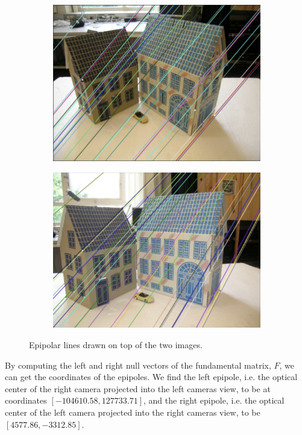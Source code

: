 \begin{figure}[h]
	\centering
	\begin{subfigure}{0.48\linewidth}
		\centering
		\includegraphics[width=\linewidth]{Materials/BaselineEpiA}
	\end{subfigure}
	\hfill
	\begin{subfigure}{0.48\linewidth}
		\centering
		\includegraphics[width=\linewidth]{Materials/BaselineEpiB}
	\end{subfigure}
	\caption{Epipolar lines drawn on top of the two images.}
	\label{baselineepipolarlines}
\end{figure}
By computing the left and right null vectors of the fundamental matrix, $F$, we can get the coordinates of the epipoles. We find the left epipole, i.e. the optical center of the right camera projected into the left cameras view, to be at coordinates $[-104610.58, 127733.71]$, and the right epipole, i.e. the optical center of the left camera projected into the right cameras view, to be $[4577.86, -3312.85]$.\\
